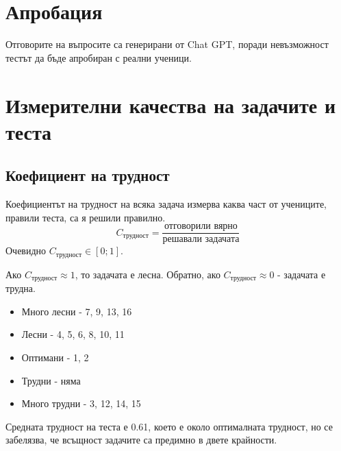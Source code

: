 
\section{Апробация}
Отговорите на въпросите са генерирани от Chat GPT, поради невъзможност тестът да бъде апробиран с реални ученици.

\section{Измерителни качества на задачите и теста}
\subsection{Коефициент на трудност}
Коефициентът на трудност на всяка задача измерва каква част от учениците, правили теста, са я решили правилно.
\begin{equation}
    C_\text{трудност} = \frac{\text{отговорили вярно}}{\text{решавали задачата}}
\end{equation}
Очевидно $C_\text{трудност} \in [0; 1]$.

Ако $C_\text{трудност} \approx 1$, то задачата е лесна. Обратно, ако $C_\text{трудност} \approx 0$ - задачата е трудна.
\begin{itemize}
    \item Много лесни - 7, 9, 13, 16
    \item Лесни - 4, 5, 6, 8, 10, 11
    \item Оптимани - 1, 2
    \item Трудни - няма
    \item Много трудни - 3, 12, 14, 15
\end{itemize}
Средната трудност на теста е 0.61, което е около оптималната трудност, но се забелязва, че всъщност задачите са предимно в двете крайности.

